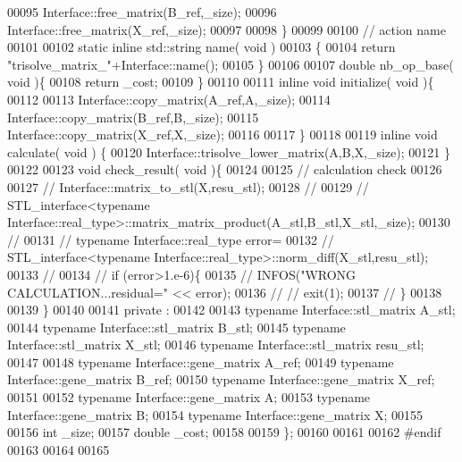 \begin{DoxyCode}
00095     Interface::free\_matrix(B\_ref,\_size);
00096     Interface::free\_matrix(X\_ref,\_size);
00097 
00098   \}
00099 
00100   \textcolor{comment}{// action name}
00101 
00102   \textcolor{keyword}{static} \textcolor{keyword}{inline} std::string name( \textcolor{keywordtype}{void} )
00103   \{
00104     \textcolor{keywordflow}{return} \textcolor{stringliteral}{"trisolve\_matrix\_"}+Interface::name();
00105   \}
00106 
00107   \textcolor{keywordtype}{double} nb\_op\_base( \textcolor{keywordtype}{void} )\{
00108     \textcolor{keywordflow}{return} \_cost;
00109   \}
00110 
00111   \textcolor{keyword}{inline} \textcolor{keywordtype}{void} initialize( \textcolor{keywordtype}{void} )\{
00112 
00113     Interface::copy\_matrix(A\_ref,A,\_size);
00114     Interface::copy\_matrix(B\_ref,B,\_size);
00115     Interface::copy\_matrix(X\_ref,X,\_size);
00116 
00117   \}
00118 
00119   \textcolor{keyword}{inline} \textcolor{keywordtype}{void} calculate( \textcolor{keywordtype}{void} ) \{
00120       Interface::trisolve\_lower\_matrix(A,B,X,\_size);
00121   \}
00122 
00123   \textcolor{keywordtype}{void} check\_result( \textcolor{keywordtype}{void} )\{
00124 
00125     \textcolor{comment}{// calculation check}
00126 
00127 \textcolor{comment}{//     Interface::matrix\_to\_stl(X,resu\_stl);}
00128 \textcolor{comment}{//}
00129 \textcolor{comment}{//     STL\_interface<typename Interface::real\_type>::matrix\_matrix\_product(A\_stl,B\_stl,X\_stl,\_size);}
00130 \textcolor{comment}{//}
00131 \textcolor{comment}{//     typename Interface::real\_type error=}
00132 \textcolor{comment}{//       STL\_interface<typename Interface::real\_type>::norm\_diff(X\_stl,resu\_stl);}
00133 \textcolor{comment}{//}
00134 \textcolor{comment}{//     if (error>1.e-6)\{}
00135 \textcolor{comment}{//       INFOS("WRONG CALCULATION...residual=" << error);}
00136 \textcolor{comment}{// //       exit(1);}
00137 \textcolor{comment}{//     \}}
00138 
00139   \}
00140 
00141 private :
00142 
00143   \textcolor{keyword}{typename} Interface::stl\_matrix A\_stl;
00144   \textcolor{keyword}{typename} Interface::stl\_matrix B\_stl;
00145   \textcolor{keyword}{typename} Interface::stl\_matrix X\_stl;
00146   \textcolor{keyword}{typename} Interface::stl\_matrix resu\_stl;
00147 
00148   \textcolor{keyword}{typename} Interface::gene\_matrix A\_ref;
00149   \textcolor{keyword}{typename} Interface::gene\_matrix B\_ref;
00150   \textcolor{keyword}{typename} Interface::gene\_matrix X\_ref;
00151 
00152   \textcolor{keyword}{typename} Interface::gene\_matrix A;
00153   \textcolor{keyword}{typename} Interface::gene\_matrix B;
00154   \textcolor{keyword}{typename} Interface::gene\_matrix X;
00155 
00156   \textcolor{keywordtype}{int} \_size;
00157   \textcolor{keywordtype}{double} \_cost;
00158 
00159 \};
00160 
00161 
00162 \textcolor{preprocessor}{#endif}
00163 
00164 
00165 
\end{DoxyCode}
